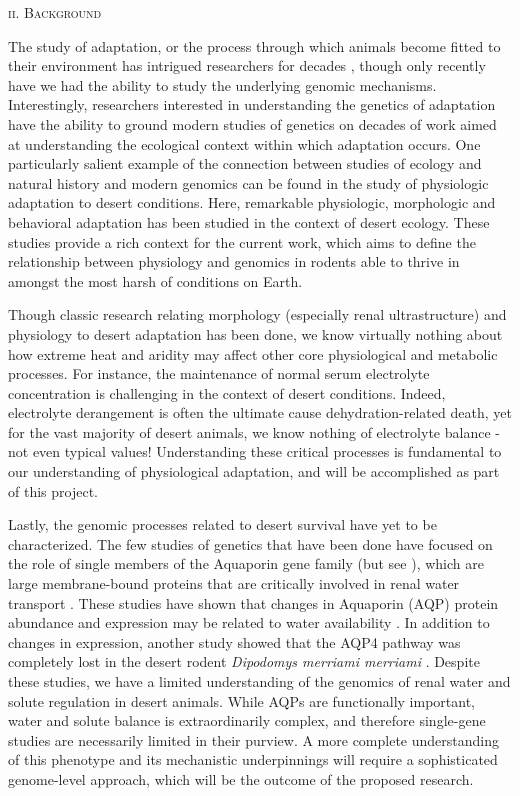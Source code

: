 \documentclass[11pt]{article}
\begin{document}
\begin{center}
\textsc{{ii. Background}} \\
\end{center}
The study of adaptation, or the process through which animals become fitted to their environment has intrigued researchers for decades \citep{Darwin:1859tm, Fisher:1930wy}, though only recently have we had the ability to study the underlying genomic mechanisms. Interestingly, researchers interested in understanding the genetics of adaptation have the ability to ground modern studies of genetics on decades of work aimed at understanding the ecological context within which adaptation occurs. One particularly salient example of the connection between studies of ecology and natural history and modern genomics can be found in the study of physiologic adaptation to desert conditions. Here, remarkable physiologic, morphologic \citep{Dickinson:2007jn,Huntley:1984us,SchmidtNielsen:1950wg,SchmidtNielsen:1952wp} and behavioral \citep{NAGY:1994vd} adaptation has been studied in the context of desert ecology. These studies provide a rich context for the current work, which aims to define the relationship between physiology and genomics in rodents able to thrive in amongst the most harsh of conditions on Earth.  

Though classic research relating morphology (especially renal ultrastructure) and physiology to desert adaptation has been done, we know virtually nothing about how extreme heat and aridity may affect other core physiological and metabolic processes. For instance, the maintenance of normal serum electrolyte concentration is challenging in the context of desert conditions. Indeed, electrolyte derangement is often the ultimate cause dehydration-related death, yet for the vast majority of desert animals, we know nothing of electrolyte balance - not even typical values! Understanding these critical processes is fundamental to our understanding of physiological adaptation, and will be accomplished as part of this project. 

Lastly, the genomic processes related to desert survival have yet to be characterized. The few studies of genetics that have been done have focused on the role of single members of the Aquaporin gene family (but see \cite{Bartolo:2007hy}), which are large membrane-bound proteins that are critically involved in renal water transport \citep{Kwon:2009bv,Verkman:2002ww,Brown:1995vo,Nielsen:1995cb}. These studies have shown that changes in Aquaporin (AQP) protein abundance and expression may be related to water availability \citep{Boselt:2009fb, Gallardo:2005fm,Bozinovic:2003eg}. In addition to changes in expression, another study showed that the AQP4 pathway was completely lost in the desert rodent \textit{Dipodomys merriami merriami} \citep{Huang:2001ti}. Despite these studies, we have a limited understanding of the genomics of renal water and solute regulation in desert animals. While AQPs are functionally important, water and solute balance is extraordinarily complex, and therefore single-gene studies are necessarily limited in their purview. A more complete understanding of this phenotype and its mechanistic underpinnings will require a sophisticated genome-level approach, which will be the outcome of the proposed research. 
\end{document}
